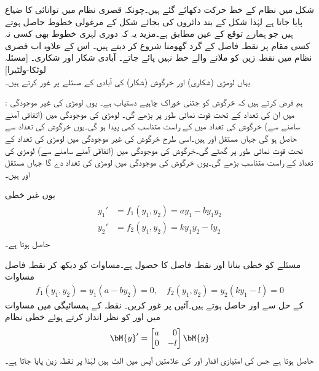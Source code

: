 شکل  میں نظام  کے خط حرکت دکھائے گئے ہیں۔چونکہ قصری نظام میں توانائی کا ضیاع پایا جاتا ہے لہٰذا شکل  کے بند دائروں کی بجائے شکل  کے مرغولی خطوط حاصل ہوتے ہیں جو ہمارے توقع کے عین مطابق ہے۔مزید یہ کہ دوری لہری خطوط بھی کسی نہ کسی مقام پر نقطہ فاصل کے گرد گھومنا شروع کر دیتے ہیں۔ اس کے علاوہ اب قصری نظام میں نقطہ زین کو ملانے والے خط نہیں پائے جاتے۔
\quad آبادی شکار اور شکاری۔ [مسئلہ لوٹکا-ولٹیرا]\\
یہاں لومڑی (شکاری) اور خرگوش (شکار) کی آبادی کے مسئلے پر غور کرتے ہیں۔

: ہم فرض کرتے ہیں کہ خرگوش کو جتنی خوراک چاہیے دستیاب ہے۔ یوں لومڑی کی غیر موجودگی میں ان کی تعداد  کے تحت قوت نمائی طور پر بڑھے گی۔ لومڑی کی موجودگی میں (اتفاقی آمنے سامنے سے)  خرگوش کی تعداد میں  کے راست متناسب کمی پیدا ہو گی۔یوں خرگوش کی تعداد  سے حاصل ہو گی جہاں مستقل  اور  ہیں۔اسی طرح خرگوش کی غیر موجودگی میں لومڑی کی تعداد  کے تحت قوت نمائی طور پر گھٹے گی۔خرگوش کی موجودگی میں (اتفاقی آمنے سامنے سے) لومڑی کی تعداد  کے راست متناسب بڑھے گی۔یوں خرگوش کی موجودگی میں   لومڑی کی تعداد دے گا جہاں مستقل  اور  ہیں۔

یوں غیر خطی  
\begin{gather}\label{مثال_نظام_شکار_شکاری_الف}
\begin{aligned}
y_1'&=f_1(y_1,y_2)=ay_1-by_1y_2\\
y_2'&=f_2(y_1,y_2)=ky_1y_2-ly_2
\end{aligned}
\end{gather}
حاصل ہوتا ہے۔

 مسئلے کو خطی بنانا اور نقطہ فاصل  کا حصول  ہے۔مساوات  کو دیکھ کر نقطہ فاصل مساوات 
\begin{align}
f_1(y_1,y_2)=y_1(a-by_2)=0, \quad f_2(y_1,y_2)=y_2(ky_1-l)=0
\end{align}
کے حل سے  اور  حاصل ہوتے ہیں۔آئیں  پر غور کریں۔ نقطہ  کے ہمسائیگی میں مساوات  میں  اور  کو نظر انداز کرتے ہوئے خطی نظام
\begin{align*}
\bM{y}'=\begin{bmatrix*}[r] a&0\\0&-l \end{bmatrix*}\bM{y}
\end{align*}
حاصل ہوتا ہے جس کی امتیازی اقدار  اور  کی علامتیں آپس میں الٹ ہیں لہٰذا  پر نقطہ زین پایا جاتا ہے۔

